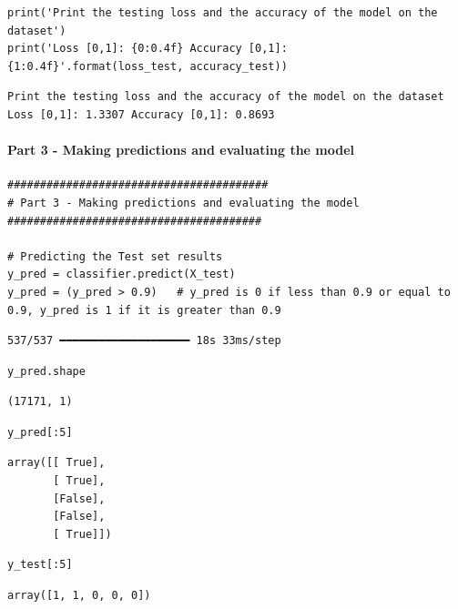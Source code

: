 \begin{verbatim}
print('Print the testing loss and the accuracy of the model on the dataset')
print('Loss [0,1]: {0:0.4f} Accuracy [0,1]: {1:0.4f}'.format(loss_test, accuracy_test))
\end{verbatim}

\begin{verbatim}
Print the testing loss and the accuracy of the model on the dataset
Loss [0,1]: 1.3307 Accuracy [0,1]: 0.8693
\end{verbatim}

\paragraph{Part 3 - Making predictions and evaluating the model}

\begin{verbatim}
########################################
# Part 3 - Making predictions and evaluating the model
#######################################

# Predicting the Test set results
y_pred = classifier.predict(X_test)
y_pred = (y_pred > 0.9)   # y_pred is 0 if less than 0.9 or equal to 0.9, y_pred is 1 if it is greater than 0.9
\end{verbatim}

\begin{verbatim}
537/537 ━━━━━━━━━━━━━━━━━━━━ 18s 33ms/step
\end{verbatim}

\begin{verbatim}
y_pred.shape
\end{verbatim}

\begin{verbatim}
(17171, 1)
\end{verbatim}

\begin{verbatim}
y_pred[:5]
\end{verbatim}

\begin{verbatim}
array([[ True],
       [ True],
       [False],
       [False],
       [ True]])
\end{verbatim}

\begin{verbatim}
y_test[:5]
\end{verbatim}

\begin{verbatim}
array([1, 1, 0, 0, 0])
\end{verbatim}

